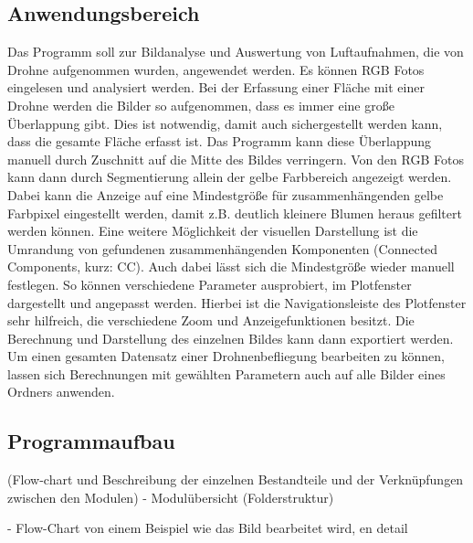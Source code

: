 \subsection{Anwendungsbereich} %
Das Programm soll zur Bildanalyse und Auswertung von Luftaufnahmen, die von Drohne aufgenommen wurden, angewendet werden. Es können RGB Fotos eingelesen und analysiert werden. Bei der Erfassung einer Fläche mit einer Drohne werden die Bilder so aufgenommen, dass es immer eine große Überlappung gibt. Dies ist notwendig, damit auch sichergestellt werden kann, dass die gesamte Fläche erfasst ist. Das Programm kann diese Überlappung manuell durch Zuschnitt auf die Mitte des Bildes verringern. Von den RGB Fotos kann dann durch Segmentierung allein der gelbe Farbbereich angezeigt werden. Dabei kann die Anzeige auf eine Mindestgröße für zusammenhängenden gelbe Farbpixel eingestellt werden, damit z.B. deutlich kleinere Blumen heraus gefiltert werden können. Eine weitere Möglichkeit der visuellen Darstellung ist die Umrandung von gefundenen zusammenhängenden Komponenten (Connected Components, kurz: CC). Auch dabei lässt sich die Mindestgröße wieder manuell festlegen. So können verschiedene Parameter ausprobiert, im Plotfenster dargestellt und angepasst werden. Hierbei ist die Navigationsleiste des Plotfenster sehr hilfreich, die verschiedene Zoom und Anzeigefunktionen besitzt. Die Berechnung und Darstellung des einzelnen Bildes kann dann exportiert werden.
Um einen gesamten Datensatz einer Drohnenbefliegung bearbeiten zu können, lassen sich Berechnungen mit gewählten Parametern auch auf alle Bilder eines Ordners anwenden.  

\subsection{Programmaufbau}
(Flow-chart und Beschreibung der einzelnen Bestandteile und der Verknüpfungen zwischen den Modulen)
     - Modulübersicht (Folderstruktur)
    
    - Flow-Chart von einem Beispiel wie das Bild bearbeitet wird, en detail

